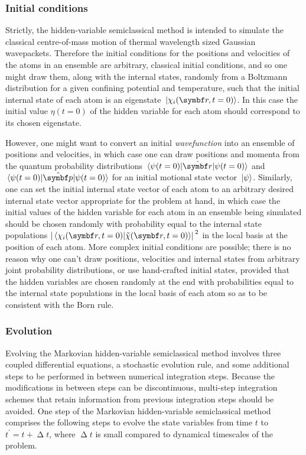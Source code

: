 \subsubsection{Initial conditions}

Strictly, the hidden-variable semiclassical method is intended to simulate the classical centre-of-mass motion of thermal wavelength sized Gaussian wavepackets. Therefore the initial conditions for the positions and velocities of the atoms in an ensemble are arbitrary, classical initial conditions, and so one might draw them, along with the internal states, randomly from a Boltzmann distribution for a given confining potential and temperature, such that the initial internal state of each atom is an eigenstate $\ket{\chi_i(\vec r, t=0)}$. In this case the initial value $\eta(t=0)$ of the hidden variable for each atom should correspond to its chosen eigenstate.

However, one might want to convert an initial \emph{wavefunction} into an ensemble of positions and velocities, in which case one can draw positions and momenta from the quantum probability distributions $\matrixel{\psi(t=0)}{\hat{\vec r}}{\psi(t=0)}$ and $\matrixel{\psi(t=0)}{\hat{\vec p}}{\psi(t=0)}$ for an initial motional state vector $\ket{\psi}$.
Similarly, one can set the initial internal state vector of each atom to an arbitrary desired internal state vector appropriate for the problem at hand, in which case the initial values of the hidden variable for each atom in an ensemble being simulated should be chosen randomly with probability equal to the internal state populations $\abs{\braket{\chi_i(\vec r, t=0)}{\tilde\chi(\vec r, t=0)}}^2$ in the local basis at the position of each atom.
More complex initial conditions are possible; there is no reason why one can't draw positions, velocities and internal states from arbitrary joint probability distributions, or use hand-crafted initial states, provided that the hidden variables are chosen randomly at the end with probabilities equal to the internal state populations in the local basis of each atom so as to be consistent with the Born rule.

\subsubsection{Evolution}

Evolving the Markovian hidden-variable semiclassical method involves three coupled differential equations, a stochastic evolution rule, and some additional steps to be performed in between numerical integration steps. Because the modifications in between steps can be discontinuous, multi-step integration schemes that retain information from previous integration steps should be avoided. One step of the Markovian hidden-variable semiclassical method comprises the following steps to evolve the state variables from time $t$ to $t^\prime = t + \upDelta t$, where $\upDelta t$ is small compared to dynamical timescales of the problem.

